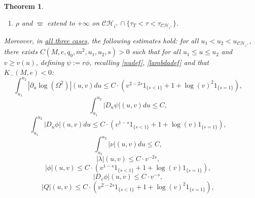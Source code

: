 \documentclass[10pt,a4paper]{article}
\theoremstyle{plain}
\newtheorem{thm}{Theorem}[section]
\theoremstyle{remark}
\theoremstyle{definition}
\theoremstyle{plain}
\theoremstyle{remark}
\theoremstyle{definition}
\newcommand{\uu}{u_{max}}
\newcommand{\CH}{\mathcal{CH}_{i^+}}
\numberwithin{equation}{section}
\begin{document}
\begin{thm}
\begin{enumerate}
\begin{enumerate}
			\item $\rho$ and $\varpi$ extend to $+\infty$ on $\CH  \cap \{ \tau_T< \tau < \tau_{\CH} \}$. 
		\end{enumerate}	 Moreover, in \underline{all three cases}, the following estimates hold: for all $u_1 <u_2<u_{\CH}$, there exists $C(M,e,q_0,m^2,u_1,u_2,s)>0$ such that for all  $u_1  \leq u \leq u_2$ and $v \geq v(u)$, defining $\psi:=r\phi$, recalling \eqref{nudef}, \eqref{lambdadef} and that $K_-(M,e)<0$: \begin{equation} \label{trappedestimate1} 
		\int_{u_1}^{u_2}  |\partial_u \log(\Omega^2)|(u,v)du  \leq C \cdot (v^{2-2s} 1_{ \{s<1\}} +   1+  \log(v)^2 1_{ \{s=1\}}) ,
		\end{equation} 	\begin{equation}  \label{trappedestimate2} 
		\int_{u_1}^{u_2}  |D_u \psi|(u,v)du  \leq C ,	\end{equation} 	\begin{equation}  \label{trappedestimate3} 
		\int_{u_1}^{u_2}   |D_u \phi|(u,v)du  \leq C \cdot (v^{1-s} 1_{ \{s<1\}} +   1 +  \log(v)1_{ \{s=1\}}) ,	\end{equation} 	\begin{equation}  \label{trappedestimate4} 
		\int_{u_1}^{u_2}  |\nu|(u,v)du  \leq C ,
		\end{equation} 	\begin{equation}  \label{trappedestimate5} 
		|\lambda|(u,v)  \leq C \cdot  v^{-2s} ,
		\end{equation} %
		\begin{equation}  \label{trappedestimate6} 
		|\phi|(u,v) \leq C \cdot   (v^{1-s} 1_{ \{s<1\}} +   1 +  \log(v)1_{ \{s=1\}}),
		\end{equation} 
		\begin{equation}  \label{trappedestimate7} 
		|D_v \phi|(u,v) \leq C \cdot v^{-s},
		\end{equation}    %
		\begin{equation}  \label{trappedestimate8} 
		|Q|(u,v) \leq C \cdot 	(v^{2-2s} 1_{ \{s<1\}} +   1+  \log(v)^2 1_{ \{s=1\}}),	\end{equation}   \begin{equation} \label{trappedestimate9} 

\end{equation}
\end{enumerate}
\end{thm}
\end{document}
